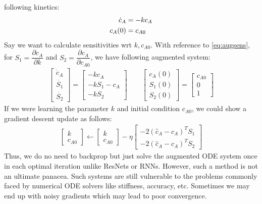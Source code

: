 \documentclass[fontsize=11pt]{article}
\theoremstyle{definition}
\begin{document}
following kinetics:
\begin{align}
    \dot{c}_A &= -kc_A \notag \\
    c_A(0) &= c_{A0}
\end{align}
Say we want to calculate sensitivities wrt $k, c_{A0}$. With reference to \cref{eq:augsens},
for $S_1 = \dfrac{\partial c_A}{\partial k}$ and $S_2 = \dfrac{\partial c_A}{\partial c_{A0}}$,
we have following augmented system:
\begin{align}
    \begin{bmatrix} 
        \dot{c}_A \\
        \dot{S_1} \\ 
        \dot{S_2} 
    \end{bmatrix} = 
    \begin{bmatrix}
        -kc_A \\
        -kS_1 - c_A \\
        -kS_2 \end{bmatrix}
    \qquad
    \begin{bmatrix} 
        c_A(0) \\ 
        S_1(0) \\ 
        S_2(0) 
    \end{bmatrix} =
    \begin{bmatrix} 
        c_{A0} \\ 
        0 \\ 
        1
    \end{bmatrix}
\end{align}
If we were learning the parameter $k$ and initial condition $c_{A0}$, we could
show a gradient descent update as follows:
\begin{align}
    \begin{bmatrix} k \\ c_{A0} \end{bmatrix} \leftarrow
    \begin{bmatrix} k \\ c_{A0} \end{bmatrix}
    - \eta 
    \begin{bmatrix} 
        -2 (\hat{c}_A  - c_A)^T S_1 \\ 
        -2 (\hat{c}_A  - c_A)^T S_2
    \end{bmatrix}
\end{align}
Thus, we do no need to backprop but just solve the augmented ODE system once 
in each optimal iteration unlike ResNets or RNNs. However, such a method is not 
an ultimate panacea. Such systems are still vulnerable to the problems commonly faced by
numerical ODE solvers like stiffness, accuracy, etc. Sometimes we may end up 
with noisy gradients which may lead to
poor convergence.
\end{document}
